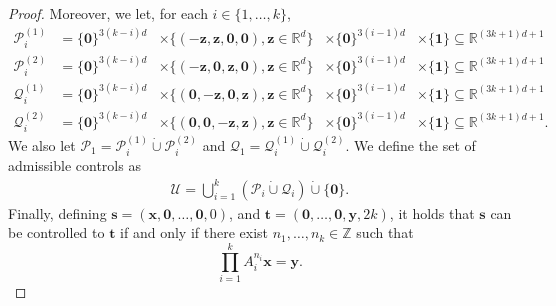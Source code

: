 \begin{proof}
Moreover, we let, for each $i \in \lbrace 1, \ldots, k \rbrace$,
\begin{align*}
\mathcal{P}_{i}^{(1)} &= {\lbrace \boldsymbol{0} \rbrace}^{3(k-i)d} &\times
\lbrace (-\boldsymbol{z}, \boldsymbol{z}, \boldsymbol{0}, \boldsymbol{0}), \boldsymbol{z} \in \mathbb{R}^{d} \rbrace &\times
{\lbrace \boldsymbol{0} \rbrace}^{3(i-1)d} &\times \lbrace \boldsymbol{1} \rbrace
\subseteq \mathbb{R}^{(3k+1)d+1} \\
\mathcal{P}_{i}^{(2)} &= {\lbrace \boldsymbol{0} \rbrace}^{3(k-i)d} &\times
\lbrace (-\boldsymbol{z}, \boldsymbol{0}, \boldsymbol{z}, \boldsymbol{0}), \boldsymbol{z} \in \mathbb{R}^{d} \rbrace &\times
{\lbrace \boldsymbol{0} \rbrace}^{3(i-1)d} &\times \lbrace \boldsymbol{1} \rbrace
\subseteq \mathbb{R}^{(3k+1)d+1} \\
\mathcal{Q}_{i}^{(1)} &= {\lbrace \boldsymbol{0} \rbrace}^{3(k-i)d} &\times
\lbrace (\boldsymbol{0}, -\boldsymbol{z}, \boldsymbol{0}, \boldsymbol{z}), \boldsymbol{z} \in \mathbb{R}^{d} \rbrace &\times
{\lbrace \boldsymbol{0} \rbrace}^{3(i-1)d} &\times \lbrace \boldsymbol{1} \rbrace
\subseteq \mathbb{R}^{(3k+1)d+1} \\
\mathcal{Q}_{i}^{(2)} &= {\lbrace \boldsymbol{0} \rbrace}^{3(k-i)d} &\times
\lbrace (\boldsymbol{0}, \boldsymbol{0}, -\boldsymbol{z}, \boldsymbol{z}), \boldsymbol{z} \in \mathbb{R}^{d} \rbrace &\times
{\lbrace \boldsymbol{0} \rbrace}^{3(i-1)d} &\times \lbrace \boldsymbol{1} \rbrace
\subseteq \mathbb{R}^{(3k+1)d+1}.
\end{align*}
We also let $\mathcal{P}_{1} = \mathcal{P}_{i}^{(1)} \dot{\cup} \mathcal{P}_{i}^{(2)}$ and $\mathcal{Q}_{1} = \mathcal{Q}_{i}^{(1)} \dot{\cup} \mathcal{Q}_{i}^{(2)}$.
We define the set of admissible controls as
\begin{align*}
\mathcal{U} = \bigcup\limits_{i=1}^{k} \left( \mathcal{P}_{i} \dot{\cup} \mathcal{Q}_{i} \right) \dot{\cup} \lbrace \boldsymbol{0} \rbrace.
\end{align*}
Finally, defining $\boldsymbol{s} = (\boldsymbol{x}, \boldsymbol{0}, \ldots, \boldsymbol{0}, 0)$, and $\boldsymbol{t} = (\boldsymbol{0}, \ldots, \boldsymbol{0}, \boldsymbol{y}, 2k)$, it holds that $\boldsymbol{s}$ can be controlled to $\boldsymbol{t}$ if and only if there exist $n_{1}, \ldots, n_{k} \in \mathbb{Z}$ such that
\begin{equation*}
\prod\limits_{i=1}^{k}A_{i}^{n_{i}} \boldsymbol{x} = \boldsymbol{y}.
\end{equation*}


\end{proof}
